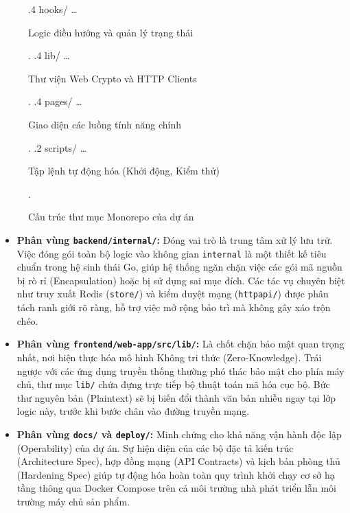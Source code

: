 \begin{figure}[H]
\begin{minipage}{0.9\textwidth}
{        .4 \normalfont hooks/ \dots{} \begin{minipage}[t]{8cm}\normalfont Logic điều hướng và quản lý trạng thái\end{minipage}.
        .4 \normalfont lib/ \dots{} \begin{minipage}[t]{8cm}\normalfont Thư viện Web Crypto và HTTP Clients\end{minipage}.
        .4 \normalfont pages/ \dots{} \begin{minipage}[t]{8cm}\normalfont Giao diện các luồng tính năng chính\end{minipage}.
        .2 \normalfont scripts/ \dots{} \begin{minipage}[t]{8cm}\normalfont Tập lệnh tự động hóa (Khởi động, Kiểm thử)\end{minipage}.
        }
    \end{minipage}
    \caption{Cấu trúc thư mục Monorepo của dự án}
    \label{fig:source_code_structure}
\end{figure}
\vspace{0.5cm}

\begin{itemize}
    \item \textbf{Phân vùng \texttt{backend/internal/}:} Đóng vai trò là trung tâm xử lý lưu trữ. Việc đóng gói toàn bộ logic vào không gian \texttt{internal} là một thiết kế tiêu chuẩn trong hệ sinh thái Go, giúp hệ thống ngăn chặn việc các gói mã nguồn bị rò rỉ (Encapsulation) hoặc bị sử dụng sai mục đích. Các tác vụ chuyên biệt như truy xuất Redis (\texttt{store/}) và kiểm duyệt mạng (\texttt{httpapi/}) được phân tách ranh giới rõ ràng, hỗ trợ việc mở rộng bảo trì mà không gây xáo trộn chéo.
    
    \item \textbf{Phân vùng \texttt{frontend/web-app/src/lib/}:} Là chốt chặn bảo mật quan trọng nhất, nơi hiện thực hóa mô hình Không tri thức (Zero-Knowledge). Trái ngược với các ứng dụng truyền thống thường phó thác bảo mật cho phía máy chủ, thư mục \texttt{lib/} chứa đựng trực tiếp bộ thuật toán mã hóa cục bộ. Bức thư nguyên bản (Plaintext) sẽ bị biến đổi thành văn bản nhiễu ngay tại lớp logic này, trước khi bước chân vào đường truyền mạng.
    
    \item \textbf{Phân vùng \texttt{docs/} và \texttt{deploy/}:} Minh chứng cho khả năng vận hành độc lập (Operability) của dự án. Sự hiện diện của các bộ đặc tả kiến trúc (Architecture Spec), hợp đồng mạng (API Contracts) và kịch bản phòng thủ (Hardening Spec) giúp tự động hóa hoàn toàn quy trình khởi chạy cơ sở hạ tầng thông qua Docker Compose trên cả môi trường nhà phát triển lẫn môi trường máy chủ sản phẩm.
\end{itemize}